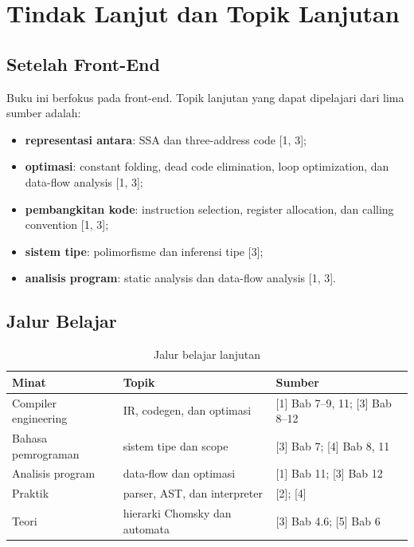 \section{Tindak Lanjut dan Topik Lanjutan}
\label{sec:ch17-lanjut}

\subsection{Setelah Front-End}

Buku ini berfokus pada front-end. Topik lanjutan yang dapat dipelajari
dari lima sumber adalah:
\begin{itemize}[leftmargin=*]
  \item \textbf{representasi antara}: SSA dan three-address code
        [1, 3];
  \item \textbf{optimasi}: constant folding, dead code elimination,
        loop optimization, dan data-flow analysis [1, 3];
  \item \textbf{pembangkitan kode}: instruction selection, register
        allocation, dan calling convention [1, 3];
  \item \textbf{sistem tipe}: polimorfisme dan inferensi tipe [3];
  \item \textbf{analisis program}: static analysis dan data-flow
        analysis [1, 3].
\end{itemize}

\subsection{Jalur Belajar}

\begin{table}[H]
\centering
\caption{Jalur belajar lanjutan}
\label{tab:ch17-jalur}
\begin{tabularx}{\textwidth}{@{}l X l@{}}
\toprule
\textbf{Minat} & \textbf{Topik} & \textbf{Sumber} \\
\midrule
Compiler engineering & IR, codegen, dan optimasi &
[1] Bab 7--9, 11; [3] Bab 8--12 \\
Bahasa pemrograman & sistem tipe dan scope &
[3] Bab 7; [4] Bab 8, 11 \\
Analisis program & data-flow dan optimasi &
[1] Bab 11; [3] Bab 12 \\
Praktik & parser, AST, dan interpreter & [2]; [4] \\
Teori & hierarki Chomsky dan automata &
[3] Bab 4.6; [5] Bab 6 \\
\bottomrule
\end{tabularx}
\end{table}

